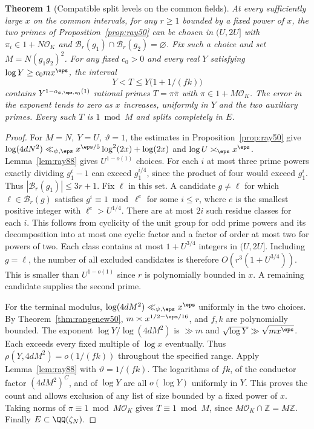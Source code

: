 \documentclass[a4paper,11pt]{article}
\newtheorem{theorem}[proposition]{Theorem}
\theoremstyle{definition}
\theoremstyle{remark}
\newcommand{\ZZ}{\mathbb Z}\newcommand{\ord}{\operatorname{ord}}
\numberwithin{equation}{section}
\begin{document}
\begin{theorem}[Compatible split levels on the common fields]
\label{thm:levels88}
At every sufficiently large \(x\) on the common intervals, for
any \(r\ge1\) bounded by a fixed power of \(x\), the two primes
of Proposition~\ref{prop:ray50} can be chosen in \((U,2U]\)
with \(\pi_i\in1+N\mathcal O_K\) and
\(\mathcal B_r(g_1)\cap\mathcal B_r(g_2)=\varnothing\).
Fix such a choice and set \(M=N(g_1g_2)^2\). For any fixed
\(c_0>0\) and every real \(Y\) satisfying
\(\log Y\ge c_0 m x^\eps\), the interval
\[
                  Y<T\le Y\bigl(1+1/(fk)\bigr)
\]
contains \(Y^{1-o_{\psi,\eps,c_0}(1)}\) rational primes
\(T=\pi\bar\pi\) with \(\pi\in1+M\mathcal O_K\). The error in the
exponent tends to zero as \(x\) increases, uniformly in \(Y\)
and the two auxiliary primes. Every such \(T\) is \(1\bmod M\)
and splits completely in \(E\).
\end{theorem}
\begin{proof}
For \(M=N,\ Y=U,\ \vartheta=1\), the estimates in
Proposition~\ref{prop:ray50} give
\(\log(4dN^2)\ll_{\psi,\eps}x^{\eps/5}\log^2(2x)+\log(2x)\)
and \(\log U\asymp_\eps x^\eps\).
Lemma~\ref{lem:ray88} gives \(U^{1-o(1)}\) choices.
For each \(i\) at most three prime powers exactly dividing
\(g_1^i-1\) can exceed \(g_1^{i/4}\), since the product of
four would exceed \(g_1^i\). Thus
\(|\mathcal B_r(g_1)|\le3r+1\).
Fix \(\ell\) in this set. A candidate \(g\ne\ell\) for which
\(\ell\in\mathcal B_r(g)\) satisfies
\(g^i\equiv1\bmod\ell^e\) for some \(i\le r\), where \(e\)
is the smallest positive integer with \(\ell^e>U^{1/4}\).
There are at most \(2i\) such residue classes for each \(i\).
This follows from cyclicity of the unit group for odd prime
powers and its decomposition into at most one cyclic factor and
a factor of order at most two for powers of two. Each class
contains at most \(1+U^{3/4}\) integers in \((U,2U]\). Including
\(g=\ell\), the number of all excluded candidates is therefore
\(O(r^3(1+U^{3/4}))\). This is smaller than \(U^{1-o(1)}\)
since \(r\) is polynomially bounded in \(x\). A remaining
candidate supplies the second prime.

For the terminal modulus, \(\log(4dM^2)\ll_{\psi,\eps}x^\eps\)
uniformly in the two choices. By Theorem~\ref{thm:rangenew50},
\(m\asymp x^{1/2-\eps/16}\), and \(f,k\) are polynomially bounded.
The exponent \(\log Y/\log(4dM^2)\) is \(\gg m\) and
\(\sqrt{\log Y}\gg\sqrt{m x^\eps}\). Each exceeds every fixed
multiple of \(\log x\) eventually. Thus
\(\rho(Y,4dM^2)=o(1/(fk))\) throughout the specified range.
Apply Lemma~\ref{lem:ray88} with \(\vartheta=1/(fk)\). The
logarithms of \(fk\), of the conductor factor \((4dM^2)^C\),
and of \(\log Y\) are all \(o(\log Y)\) uniformly in \(Y\).
This proves the count and allows exclusion of any list of size
bounded by a fixed power of \(x\). Taking norms of
\(\pi\equiv1\bmod M\mathcal O_K\) gives \(T\equiv1\bmod M\), since
\(M\mathcal O_K\cap\ZZ=M\ZZ\). Finally \(E\subset\QQ(\zeta_N)\).
\end{proof}
\end{document}
